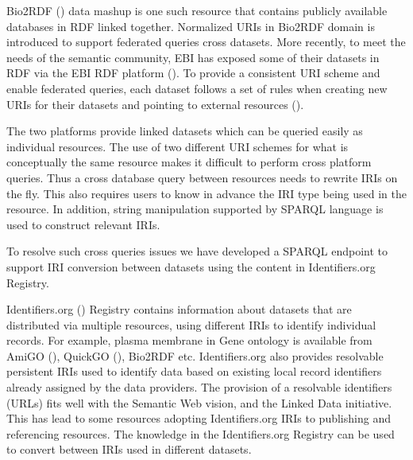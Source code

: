 \documentclass{bioinfo}
\begin{document}
Bio2RDF (\cite{Belleau2008706}) data mashup is one such resource that contains publicly available databases in RDF linked together. 
Normalized URIs in Bio2RDF domain is introduced to support federated queries cross datasets.
More recently, to meet the needs of the semantic community, EBI has exposed some of their datasets in RDF via the EBI RDF platform (\cite{Jupp01052014}). 
To provide a consistent URI scheme and enable federated queries, each dataset follows a set of rules when creating new URIs for their datasets and pointing to external resources (\cite{Jupp01052014}).

The two platforms provide linked datasets which can be queried easily as individual resources. 
The use of two different URI schemes for what is conceptually the same resource makes it difficult to perform cross platform queries.
Thus a cross database query between resources needs to rewrite IRIs on the fly.
This also requires users to know in advance the IRI type being used in the resource.
In addition, string manipulation supported by SPARQL language is used to construct relevant IRIs.

To resolve such cross queries issues we have developed a SPARQL endpoint to support IRI conversion between datasets using the content in Identifiers.org Registry.

Identifiers.org (\cite{Juty01012012}) Registry contains information about datasets that are distributed via multiple resources, using different IRIs to identify individual records. 
For example, plasma membrane in Gene ontology is available from AmiGO (\cite{Carbon2009}), QuickGO (\cite{Binns2009}), Bio2RDF etc.
Identifiers.org also provides resolvable persistent IRIs used to identify data based on existing local record identifiers already assigned by the data providers. 
The provision of a resolvable identifiers (URLs) fits well with the Semantic Web vision, and the Linked Data initiative.
This has lead to some resources adopting Identifiers.org IRIs to publishing and referencing resources.
The knowledge in the Identifiers.org Registry can be used to convert between IRIs used in different datasets.
\end{document}
